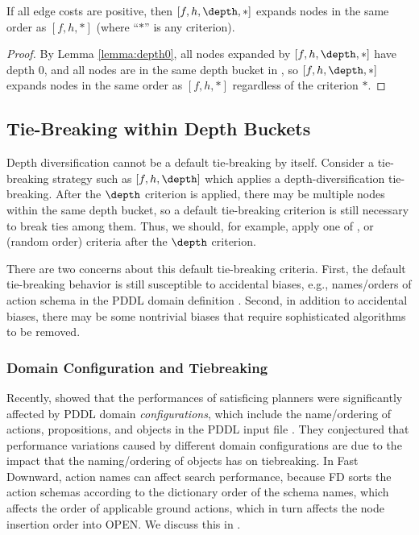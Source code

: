 \begin{theo}
  If all edge costs are positive, then \astar $[f,h,\depth,*]$ expands nodes in the same order as  \astar $[f,h,*]$ (where ``$*$'' is any criterion).
\end{theo}
\begin{proof}
  By Lemma \ref{lemma:depth0}, all nodes expanded by \astar $[f,h,\depth,*]$ have depth 0, and all nodes are in the same depth bucket in , so \astar $[f,h,\depth,*]$ expands nodes in the same order as \astar $[f,h,*]$ regardless of the criterion $*$.
\end{proof}


\subsection{Tie-Breaking within Depth Buckets}

Depth diversification cannot be a default tie-breaking by itself.
Consider a tie-breaking strategy such as $[f,h,\depth]$ which applies a depth-diversification tie-breaking.
After the $\depth$ criterion is applied, 
there may be multiple nodes within the same depth bucket, so a
default tie-breaking criterion is still necessary to break ties among them.
Thus, we should, for example, apply one of \lifo, \fifo or \ro (random order) criteria
after the $\depth$ criterion.

There are two concerns about this default tie-breaking criteria.
First, the default tie-breaking behavior is still susceptible to 
 accidental biases, e.g., names/orders of action schema in the PDDL domain definition \cite{vallati2015effective}.
Second, in addition to accidental biases, there may be some nontrivial biases that require 
sophisticated algorithms to be removed.

\subsubsection{Domain Configuration and Tiebreaking}

Recently, \citeauthor{vallati2015effective} showed that the performances of 
satisficing planners were significantly affected by PDDL domain \emph{configurations}, which include the name/ordering of actions, propositions, and objects in the PDDL input file \citeyear{vallati2015effective}.
They conjectured that performance variations caused
by different domain configurations are due to the impact that the naming/ordering of objects has on tiebreaking.
In Fast Downward, action names can affect search performance, because FD 
sorts the action schemas according to the dictionary
order of the schema names, which affects the order of applicable ground
actions, which in turn affects the node insertion order into OPEN.
We discuss this in .

